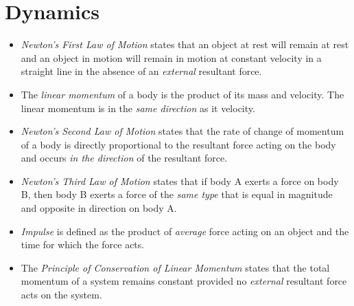 \documentclass[oneside]{book}
\begin{document}
\chapter{Dynamics}
\begin{itemize}
    \item \textit{Newton's First Law of Motion} states that an object at rest will remain at rest and an object in motion will remain in motion at constant velocity in a straight line in the absence of an \emph{external} resultant force.
    \item The \textit{linear momentum} of a body is the product of its mass and velocity. The linear momentum is in the \emph{same direction} as it velocity.
    \item \textit{Newton's Second Law of Motion} states that the rate of change of momentum of a body is directly proportional to the resultant force acting on the body and occurs \emph{in the direction} of the resultant force.
    \item \textit{Newton's Third Law of Motion} states that if body A exerts a force on body B, then body B exerts a force of the \emph{same type} that is equal in magnitude and opposite in direction on body A.
    \item \textit{Impulse} is defined as the product of \emph{average} force acting on an object and the time for which the force acts.
    \item The \textit{Principle of Conservation of Linear Momentum} states that the total momentum of a system remains constant provided no \emph{external} resultant force acts on the system.
\end{itemize}
\end{document}
